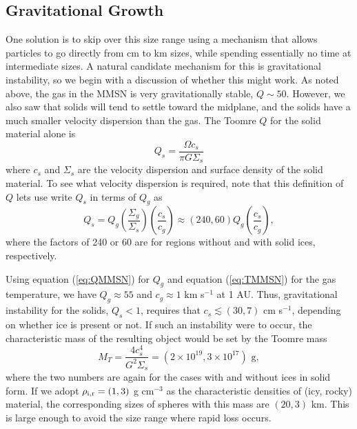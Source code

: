 \subsection{Gravitational Growth}

One solution is to skip over this size range using a mechanism that allows particles to go directly from cm to km sizes, while spending essentially no time at intermediate sizes. A natural candidate mechanism for this is gravitational instability, so we begin with a discussion of whether this might work. As noted above, the gas in the MMSN is very gravitationally stable, $Q \sim 50$. However, we also saw that solids will tend to settle toward the midplane, and the solids have a much smaller velocity dispersion than the gas. The Toomre $Q$ for the solid material alone is
\begin{equation}
Q_s = \frac{\Omega c_s}{\pi G \Sigma_s}
\end{equation}
where $c_s$ and $\Sigma_s$ are the velocity dispersion and surface density of the solid material. To see what velocity dispersion is required, note that this definition of $Q$ lets use write $Q_s$ in terms of $Q_g$ as
\begin{equation}
Q_s = Q_g \left(\frac{\Sigma_g}{\Sigma_s}\right) \left(\frac{c_s}{c_g}\right) \approx(240, 60) Q_g \left(\frac{c_s}{c_g}\right),
\end{equation}
where the factors of 240 or 60 are for regions without and with solid ices, respectively.

Using equation (\ref{eq:QMMSN}) for $Q_g$ and equation (\ref{eq:TMMSN}) for the gas temperature, we have $Q_g\approx 55$ and $c_g\approx 1$ km s$^{-1}$ at 1 AU. Thus, gravitational instability for the solids, $Q_s<1$, requires that $c_s \lesssim (30, 7)$ cm s$^{-1}$, depending on whether ice is present or not. If such an instability were to occur, the characteristic mass of the resulting object would be set by the Toomre mass
\begin{equation}
M_T = \frac{4 c_s^4}{G^2 \Sigma_s} = (2\times 10^{19}, 3\times 10^{17})\mbox{ g},
\end{equation}
where the two numbers are again for the cases with and without ices in solid form. If we adopt $\rho_{\rm i,r} = (1,3)$ g cm$^{-3}$ as the characteristic densities of (icy, rocky) material, the corresponding sizes of spheres with this mass are $(20, 3)$ km. This is large enough to avoid the size range where rapid loss occurs.

